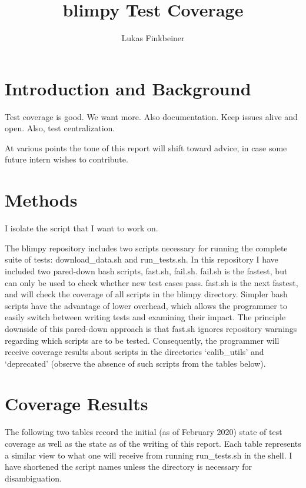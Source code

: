 \documentclass[12pt]{article}
\title{blimpy Test Coverage}
\author{Lukas Finkbeiner}
\begin{document}
\maketitle


\section{Introduction and Background}

\quad \quad Test coverage is good. We want more. Also documentation. Keep issues alive and open. Also, test centralization.

At various points the tone of this report will shift toward advice, in case some future intern wishes to contribute.

\section{Methods}

\quad \quad I isolate the script that I want to work on.

The blimpy repository includes two scripts necessary for running the complete suite of tests: download\_data.sh and run\_tests.sh. In this repository I have included two pared-down bash scripts, fast.sh, fail.sh. fail.sh is the fastest, but can only be used to check whether new test cases pass. fast.sh is the next fastest, and will check the coverage of all scripts in the blimpy directory. Simpler bash scripts have the advantage of lower overhead, which allows the programmer to easily switch between writing tests and examining their impact. The principle downside of this pared-down approach is that fast.sh ignores repository warnings regarding which scripts are to be tested. Consequently, the programmer will receive coverage results about scripts in the directories `calib\_utils' and `deprecated' (observe the absence of such scripts from the tables below). 

\section{Coverage Results}

\quad \quad The following two tables record the initial (as of February 2020) state of test coverage as well as the state as of the writing of this report. Each table represents a similar view to what one will receive from running run\_tests.sh in the shell. I have shortened the script names unless the directory is necessary for disambiguation.
\end{document}

